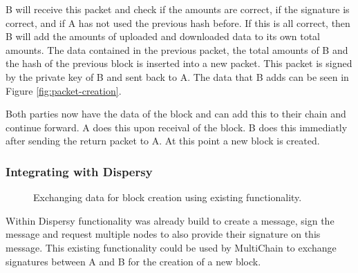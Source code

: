 B will receive this packet and check if the amounts are correct, if the signature is correct,
and if A has not used the previous hash before.
If this is all correct,
then B will add the amounts of uploaded and downloaded data to its own total amounts.
The data contained in the previous packet, the total amounts of B and the hash of the previous block is
inserted into a new packet.
This packet is signed by the private key of B and sent back to A.
The data that B adds can be seen in Figure \ref{fig:packet-creation}.

Both parties now have the data of the block and can add this to their chain and continue forward.
A does this upon receival of the block.
B does this immediatly after sending the return packet to A.
At this point a new block is created.

\subsubsection{Integrating with Dispersy}
\begin{figure}[!h]
\centering
{}

\caption{Exchanging data for block creation using existing functionality.}
\label{fig:synthetic-anonymous-amounts}
\end{figure}
Within Dispersy functionality was already build to create a message, sign the message
and request multiple nodes to also provide their signature on this message.
This existing functionality could be used by MultiChain to exchange signatures
between A and B for the creation of a new block.

